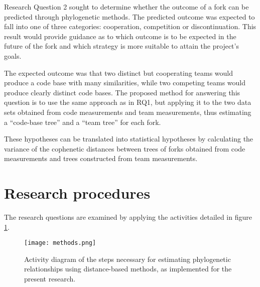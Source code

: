 Research Question 2 sought to determine whether the outcome of a fork can be predicted through phylogenetic methods. The predicted outcome was expected to fall into one of three categories: cooperation, competition or discontinuation. This result would provide guidance as to which outcome is to be expected in the future of the fork and which strategy is more suitable to attain the project's goals. 

The expected outcome was that two distinct but cooperating teams would produce a code base with many similarities, while two competing teams would produce clearly distinct code bases. The proposed method for answering this question is to use the same approach as in RQ1, but applying it to the two data sets obtained from code measurements and team measurements, thus estimating a “code-base tree” and a “team tree” for each fork. 



\noindent
These hypotheses can be translated into statistical hypotheses by calculating the variance of the cophenetic distances between trees of forks obtained from code measurements and trees constructed from team measurements.



\section{Research procedures}
The research questions are examined by applying the activities detailed in figure \ref{fig:methods}.

\begin{figure}[H]
  \centering
  \texttt{[image: methods.png]}
  \caption{Activity diagram of the steps necessary for estimating phylogenetic relationships using distance-based methods, as implemented for the present research.}
  \label{fig:methods}
\end{figure}


